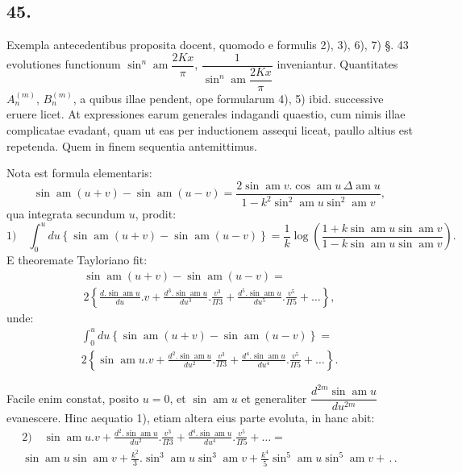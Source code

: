 \documentclass{article}
\begin{document}
\subsection*{45.}
Exempla antecedentibus proposita docent, quomodo e formulis 2), 3), 6), 7) §. 43 evolutiones functionum $\sin^{n}\operatorname{am}\dfrac{2Kx}{\pi}$, $\dfrac{1}{\sin^{n}\operatorname{am}\dfrac{2Kx}{\pi}}$ inveniantur. Quantitates $A_{n}^{(m)}$, $B_{n}^{(m)}$, a quibus illae pendent, ope formularum 4), 5) ibid. successive eruere licet. At expressiones earum generales indagandi quaestio, cum nimis illae complicatae evadant, quam ut eas per inductionem assequi liceat, paullo altius est repetenda. Quem in finem sequentia antemittimus.

Nota est formula elementaris:
\[
\sin\operatorname{am}(u+v)-\sin\operatorname{am}(u-v)=\frac{2\sin\operatorname{am}v.\cos\operatorname{am}u\,\Delta\operatorname{am}u}{1-k^{2}\sin^{2}\operatorname{am}u\sin^{2}\operatorname{am}v},
\]
qua integrata secundum $u$, prodit:
\[
\text{1)}\quad\int_{0}^{u}du\left\{\sin\operatorname{am}(u+v)-\sin\operatorname{am}(u-v)\right\}=\frac{1}{k}\log\left(\frac{1+k\sin\operatorname{am}u\sin\operatorname{am}v}{1-k\sin\operatorname{am}u\sin\operatorname{am}v}\right).
\]
E theoremate Tayloriano fit:
\[
\begin{gathered}
\sin\operatorname{am}(u+v)-\sin\operatorname{am}(u-v)=\\[1.5ex]
2\left\{\frac{d.\sin\operatorname{am}u}{du}.v+\frac{d^{3}.\sin\operatorname{am}u}{du^{3}}.\frac{v^{3}}{\Pi 3}+\frac{d^{5}.\sin\operatorname{am}u}{du^{5}}.\frac{v^{5}}{\Pi 5}+\ldots\right\},
\end{gathered}
\]
unde:
\[
\begin{gathered}
\int_{0}^{u}du\left\{\sin\operatorname{am}(u+v)-\sin\operatorname{am}(u-v)\right\}=\\[1.5ex]
2\left\{\sin\operatorname{am}u.v+\frac{d^{2}.\sin\operatorname{am}u}{du^{2}}.\frac{v^{3}}{\Pi 3}+\frac{d^{4}.\sin\operatorname{am}u}{du^{4}}.\frac{v^{5}}{\Pi 5}+\ldots\right\}.
\end{gathered}
\]

Facile enim constat, posito $u=0$, et $\sin\operatorname{am}u$ et generaliter $\dfrac{d^{2m}\sin\operatorname{am}u}{du^{2m}}$ evanescere. Hinc aequatio 1), etiam altera eius parte evoluta, in hanc abit:
\[
\begin{gathered}
\text{2)}\quad\sin\operatorname{am}u.v+\frac{d^{2}.\sin\operatorname{am}u}{du^{2}}.\frac{v^{3}}{\Pi 3}+\frac{d^{4}.\sin\operatorname{am}u}{du^{4}}.\frac{v^{5}}{\Pi 5}+\ldots=\\[1.5ex]
\sin\operatorname{am}u\sin\operatorname{am}v+\frac{k^{2}}{3}.\sin^{3}\operatorname{am}u\sin^{3}\operatorname{am}v+\frac{k^{4}}{5}\sin^{5}\operatorname{am}u\sin^{5}\operatorname{am}v+\,.\,.
\end{gathered}
\]
\end{document}
